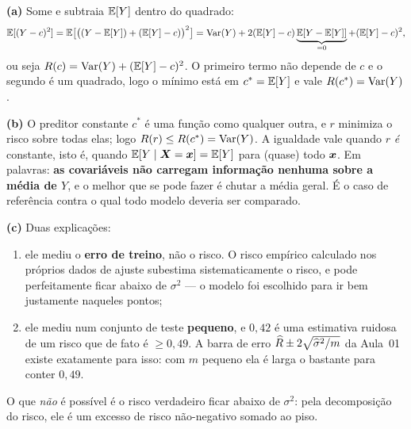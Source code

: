 \documentclass[11pt,a4paper]{article}
\begin{document}
\begin{solucao}
\textbf{(a)} Some e subtraia $\mathbb{E}[Y]$ dentro do quadrado:
\[
  \mathbb{E}[(Y-c)^2] = \mathbb{E}\big[\big((Y-\mathbb{E}[Y]) + (\mathbb{E}[Y]-c)\big)^2\big]
              = \operatorname{Var}(Y) + 2(\mathbb{E}[Y]-c)\underbrace{\mathbb{E}[Y-\mathbb{E}[Y]]}_{=0} + (\mathbb{E}[Y]-c)^2,
\]
ou seja $R(c)=\operatorname{Var}(Y)+(\mathbb{E}[Y]-c)^2$. O primeiro termo não depende de $c$ e o
segundo é um quadrado, logo o mínimo está em $c^\ast=\mathbb{E}[Y]$ e vale
$R(c^\ast)=\operatorname{Var}(Y)$.

\smallskip
\textbf{(b)} O preditor constante $c^\ast$ é uma função como qualquer outra, e $r$
minimiza o risco sobre todas elas; logo $R(r)\le R(c^\ast)=\operatorname{Var}(Y)$. A
igualdade vale quando $r$ \emph{é} constante, isto é, quando
$\mathbb{E}[Y\mid\bm{X}=\bm{x}]=\mathbb{E}[Y]$ para (quase) todo $\bm{x}$. Em palavras: \textbf{as covariáveis
não carregam informação nenhuma sobre a média de $Y$}, e o melhor que se pode
fazer é chutar a média geral. É o caso de referência contra o qual todo modelo
deveria ser comparado.

\smallskip
\textbf{(c)} Duas explicações:
\begin{enumerate}[label=(\roman*),leftmargin=1.1cm]
  \item ele mediu o \textbf{erro de treino}, não o risco. O risco empírico
        calculado nos próprios dados de ajuste subestima sistematicamente o risco,
        e pode perfeitamente ficar abaixo de $\sigma^2$ --- o modelo foi escolhido
        para ir bem justamente naqueles pontos;
  \item ele mediu num conjunto de teste \textbf{pequeno}, e $0{,}42$ é uma
        estimativa ruidosa de um risco que de fato é $\ge 0{,}49$. A barra de erro
        $\widehat{R}\pm 2\sqrt{\widehat\sigma^2/m}$ da Aula~01 existe exatamente para
        isso: com $m$ pequeno ela é larga o bastante para conter $0{,}49$.
\end{enumerate}
O que \emph{não} é possível é o risco verdadeiro ficar abaixo de $\sigma^2$: pela
decomposição do risco, ele é um excesso de risco não-negativo somado ao piso.
\end{solucao}
\end{document}
